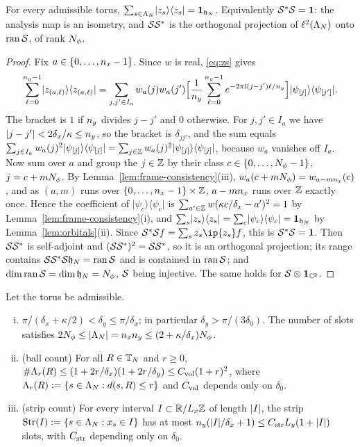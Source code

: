 \begin{proposition}[Parseval]\label{prop:parseval}
For every admissible torus, $\sum_{s\in\Lambda_N}\lvert z_s\rangle\langle z_s\rvert=\mathbf{1}_{\mathfrak{h}_N}$. Equivalently
$\mathcal{S}^*\mathcal{S}=\mathbf{1}$: the analysis map is an isometry, and $\mathcal{S}\mathcal{S}^*$ is the orthogonal projection of
$\ell^2(\Lambda_N)$ onto $\operatorname{ran}\mathcal{S}$, of rank $N_{\phi}$.
\end{proposition}

\begin{proof}
Fix $a\in\{0,\dots,n_x-1\}$. Since $w$ is real, \eqref{eq:zs} gives
\[
\sum_{\ell=0}^{n_y-1}\lvert z_{(a,\ell)}\rangle\langle z_{(a,\ell)}\rvert
=\sum_{j,j'\in I_a}w_a(j)w_a(j')\Bigl[\frac1{n_y}\sum_{\ell=0}^{n_y-1}e^{-2\pi\mathrm{i}(j-j')\ell/n_y}\Bigr]
\lvert\psi_{[j]}\rangle\langle\psi_{[j']}\rvert .
\]
The bracket is $1$ if $n_y$ divides $j-j'$ and $0$ otherwise. For $j,j'\in I_a$ we have
$\lvert j-j'\rvert<2\delta_x/\kappa\le n_y$, so the bracket is $\delta_{jj'}$, and the sum equals
$\sum_{j\in I_a}w_a(j)^2\lvert\psi_{[j]}\rangle\langle\psi_{[j]}\rvert=\sum_{j\in\mathbb{Z}}w_a(j)^2\lvert\psi_{[j]}\rangle\langle\psi_{[j]}\rvert$,
because $w_a$ vanishes off $I_a$. Now sum over $a$ and group the $j\in\mathbb{Z}$ by their class $c\in\{0,\dots,N_{\phi}-1\}$,
$j=c+mN_{\phi}$. By Lemma~\ref{lem:frame-consistency}(iii), $w_a(c+mN_{\phi})=w_{a-mn_x}(c)$, and as $(a,m)$ runs over
$\{0,\dots,n_x-1\}\times\mathbb{Z}$, $a-mn_x$ runs over $\mathbb{Z}$ exactly once. Hence the coefficient of
$\lvert\psi_c\rangle\langle\psi_c\rvert$ is $\sum_{a'\in\mathbb{Z}}w(\kappa c/\delta_x-a')^2=1$ by
Lemma~\ref{lem:frame-consistency}(i), and $\sum_s\lvert z_s\rangle\langle z_s\rvert=\sum_c\lvert\psi_c\rangle\langle\psi_c\rvert=\mathbf{1}_{\mathfrak{h}_N}$
by Lemma~\ref{lem:orbitals}(ii). Since $\Sa^*\Sa f=\sum_sz_s\ip{z_s}f$, this is $\mathcal{S}^*\mathcal{S}=\mathbf{1}$. Then $\mathcal{S}\mathcal{S}^*$ is
self-adjoint and $(\mathcal{S}\mathcal{S}^*)^2=\mathcal{S}\mathcal{S}^*$, so it is an orthogonal projection; its range contains
$\mathcal{S}\mathcal{S}^*\mathcal{S}\mathfrak{h}_N=\operatorname{ran}\mathcal{S}$ and is contained in $\operatorname{ran}\mathcal{S}$; and $\dim\operatorname{ran}\mathcal{S}=\dim\mathfrak{h}_N=N_{\phi}$, $\mathcal{S}$ being injective.
The same holds for $\mathcal{S}\otimes\mathbf{1}_{\mathbb{C}^2}$.
\end{proof}

\begin{proposition}\label{prop:geometry}
Let the torus be admissible.
\begin{enumerate}[(i)]
\item $\pi/(\delta_x+\kappa/2)<\delta_y\le\pi/\delta_x$; in particular $\delta_y>\pi/(3\delta_0)$. The number of
slots satisfies $2N_{\phi}\le\lvert\Lambda_N\rvert=n_xn_y\le(2+\kappa/\delta_x)N_{\phi}$.
\item (ball count) For all $R\in\mathbb{T}_N$ and $r\ge0$, $\#\Lambda_{r}(R)\le(1+2r/\delta_x)(1+2r/\delta_y)\le C_{\mathrm{vol}}(1+r)^2$,
where $\Lambda_{r}(R):=\{s\in\Lambda_N:d(s,R)\le r\}$ and $C_{\mathrm{vol}}$ depends only on $\delta_0$.
\item (strip count) For every interval $I\subset\mathbb{R}/L_x\mathbb{Z}$ of length $\lvert I\rvert$, the strip
$\mathrm{Str}(I):=\{s\in\Lambda_N:x_s\in I\}$ has at most $n_y(\lvert I\rvert/\delta_x+1)\le C_{\rm str}L_y(1+\lvert I\rvert)$ slots, with
$C_{\rm str}$ depending only on $\delta_0$.
\end{enumerate}
\end{proposition}

